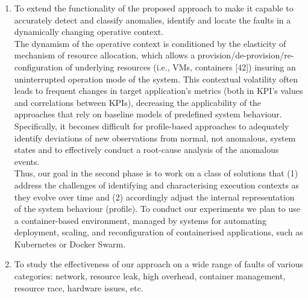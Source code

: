 \documentclass[]{usiinfprospectus}
\begin{document}
\begin{enumerate}
   \item To extend the functionality of the proposed approach to make it capable to accurately detect and classify anomalies, identify and locate the faults in a dynamically changing operative context.\\
%
The dynamism of the operative context is conditioned by the elasticity of mechanism of resource allocation, which allows a provision/de-provision/re-configuration of underlying resources (i.e., VMs, containers [42]) insuring an uninterrupted operation mode of the system. This contextual volatility often leads to frequent changes in target application's metrics (both in KPI's values and correlations between KPIs), decreasing the applicability of the approaches that rely on baseline models of predefined system behaviour. Specifically, it becomes difficult for profile-based approaches to adequately identify deviations of new observations from normal, not anomalous, system states and to effectively conduct a root-cause analysis of the anomalous events.\\
%
Thus, our goal in the second phase is to work on a class of solutions that (1) address the challenges of identifying and characterising execution contexts as they evolve over time and (2) accordingly adjust the internal representation of the system behaviour (profile). To conduct our experiments we plan to use a container-based environment, managed by systems for automating deployment, scaling, and reconfiguration of containerised applications, such as Kubernetes or Docker Swarm.
   \item To study the effectiveness of our approach on a wide range of faults of various categories: network, resource leak, high overhead, container management, resource race, hardware issues, etc.
\end{enumerate}
%
%
%
%
\end{document}
